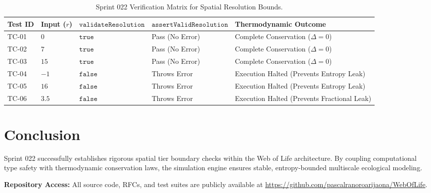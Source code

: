 \documentclass[11pt, a4paper]{article}
\begin{document}
\begin{table}[htbp]
\centering
\begin{tabular}{lllll}
\toprule
\textbf{Test ID} & \textbf{Input ($r$)} & \textbf{$\texttt{validateResolution}$} & \textbf{$\texttt{assertValidResolution}$} & \textbf{Thermodynamic Outcome} \\
\midrule
TC-01 & $0$ & $\texttt{true}$ & Pass (No Error) & Complete Conservation ($\Delta = 0$) \\
TC-02 & $7$ & $\texttt{true}$ & Pass (No Error) & Complete Conservation ($\Delta = 0$) \\
TC-03 & $15$ & $\texttt{true}$ & Pass (No Error) & Complete Conservation ($\Delta = 0$) \\
TC-04 & $-1$ & $\texttt{false}$ & Throws Error & Execution Halted (Prevents Entropy Leak) \\
TC-05 & $16$ & $\texttt{false}$ & Throws Error & Execution Halted (Prevents Entropy Leak) \\
TC-06 & $3.5$ & $\texttt{false}$ & Throws Error & Execution Halted (Prevents Fractional Leak) \\
\bottomrule
\end{tabular}
\caption{Sprint 022 Verification Matrix for Spatial Resolution Bounds.}
\label{tab:sprint022_matrix}
\end{table}

\section{Conclusion}
Sprint 022 successfully establishes rigorous spatial tier boundary checks within the Web of Life architecture. By coupling computational type safety with thermodynamic conservation laws, the simulation engine ensures stable, entropy-bounded multiscale ecological modeling.

\vspace{1em}
\noindent\textbf{Repository Access:} All source code, RFCs, and test suites are publicly available at \url{https://github.com/pascalranoroarijaona/WebOfLife}.
\end{document}
